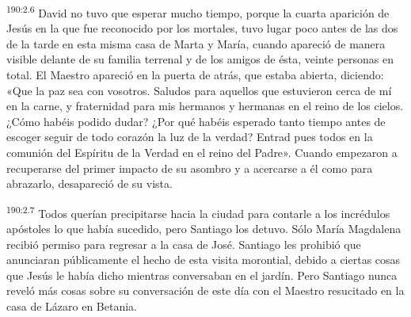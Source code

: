 \par 
\textsuperscript{190:2.6} David no tuvo que esperar mucho tiempo, porque la cuarta aparición de Jesús en la que fue reconocido por los mortales, tuvo lugar poco antes de las dos de la tarde en esta misma casa de Marta y María, cuando apareció de manera visible delante de su familia terrenal y de los amigos de ésta, veinte personas en total. El Maestro apareció en la puerta de atrás, que estaba abierta, diciendo: «Que la paz sea con vosotros. Saludos para aquellos que estuvieron cerca de mí en la carne, y fraternidad para mis hermanos y hermanas en el reino de los cielos. ¿Cómo habéis podido dudar? ¿Por qué habéis esperado tanto tiempo antes de escoger seguir de todo corazón la luz de la verdad? Entrad pues todos en la comunión del Espíritu de la Verdad en el reino del Padre». Cuando empezaron a recuperarse del primer impacto de su asombro y a acercarse a él como para abrazarlo, desapareció de su vista.

\par 
\textsuperscript{190:2.7} Todos querían precipitarse hacia la ciudad para contarle a los incrédulos apóstoles lo que había sucedido, pero Santiago los detuvo. Sólo María Magdalena recibió permiso para regresar a la casa de José. Santiago les prohibió que anunciaran públicamente el hecho de esta visita morontial, debido a ciertas cosas que Jesús le había dicho mientras conversaban en el jardín. Pero Santiago nunca reveló más cosas sobre su conversación de este día con el Maestro resucitado en la casa de Lázaro en Betania.

